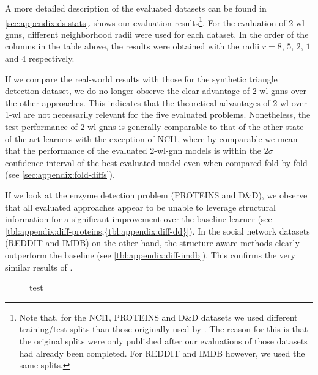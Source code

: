 A more detailed description of the evaluated datasets can be found in \cref{sec:appendix:ds-stats}.
 shows our evaluation results\footnote{
	Note that, for the NCI1, PROTEINS and D\&D datasets we used different training/test splits than those originally used by \citet{Errica2020}.
	The reason for this is that the original splits were only published after our evaluations of those datasets had already been completed.
	For REDDIT and IMDB however, we used the same splits.
}.
For the evaluation of 2-\acs{wl}-\acsp{gnn}, different neighborhood radii were used for each dataset.
In the order of the columns in the table above, the results were obtained with the radii $r = 8$, $5$, $2$, $1$ and $4$ respectively.

If we compare the real-world results with those for the synthetic triangle detection dataset, we do no longer observe the clear advantage of 2-\acs{wl}-\acsp{gnn} over the other approaches.
This indicates that the theoretical advantages of 2-\acs{wl} over 1-\acs{wl} are not necessarily relevant for the five evaluated problems.
Nonetheless, the test performance of 2-\acs{wl}-\acsp{gnn} is generally comparable to that of the other state-of-the-art learners with the exception of NCI1,
where by comparable we mean that the performance of the evaluated 2-\acs{wl}-\acs{gnn} models is within the $2\sigma$ confidence interval of the best evaluated model even when compared fold-by-fold (see \cref{sec:appendix:fold-diffs}).

If we look at the enzyme detection problem (PROTEINS and D\&D), we observe that all evaluated approaches appear to be unable to leverage structural information for a significant improvement over the baseline learner (see \cref{tbl:appendix:diff-proteins,{tbl:appendix:diff-dd}}).
In the social network datasets (REDDIT and IMDB) on the other hand, the structure aware methods clearly outperform the baseline (see \cref{tbl:appendix:diff-imdb}).
This confirms the very similar results of \citet{Errica2020}.

\begin{figure}[ht]
	\centering
	\caption{test}\label{fig:eval:wlst-depths}
\end{figure}

